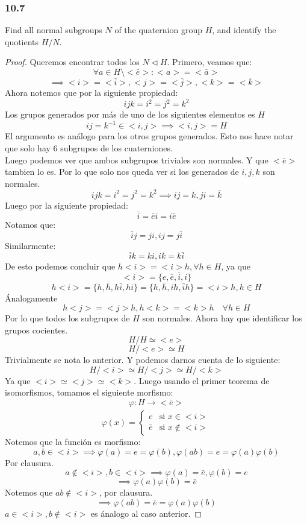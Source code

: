 \documentclass[11pt]{article}
\newcommand{\func}[5]{#1:#2\xrightarrow[#5]{#4}#3}
\theoremstyle{definition}
\begin{document}
\subsubsection{10.7}
Find all normal subgroups $N$ of the quaternion group $H$, and identify the quotients $H/N$.
\begin{proof}
    Queremos encontrar todos los $N\triangleleft H$. Primero, veamos que: 
    \[\forall a\in H\setminus<\bar{e}>:<a>=<\bar{a}>\]
    \[\implies <i>=<\bar{i}>,<j>=<\bar{j}>,<k>=<\bar{k}>\]
    Ahora notemos que por la siguiente propiedad:
    \[ijk=i^2=j^2=k^2\]
    Los grupos generados por más de uno de los siguientes elementos es $H$
    \[ij=k^{-1}\in <i,j>\implies <i,j>=H\]
    El argumento es análogo para los otros grupos generados. Esto nos hace notar que solo hay 6 subgrupos de los cuaterniones.\\
    Luego podemos ver que ambos subgrupos triviales son normales. Y que $<\bar{e}>$ tambien lo es. Por lo que solo nos queda ver si los generados de $i,j,k$ son normales.
    \[ijk=i^2=j^2=k^2\implies ij=k, ji=\bar{k}\]
    Luego por la siguiente propiedad:
    \[\bar{i}=\bar{e}i=i\bar{e}\]
    Notamos que:
    \[\bar{i}j=ji, ij=j\bar{i}\]
    Similarmente:
    \[\bar{i}k=ki, ik=k\bar{i}\]
    De esto podemos concluir que $h<i>=<i>h, \forall h\in H$, ya que 
    \[<i>=\{e,\bar{e},\bar{i},i\}\]
    \[h<i>=\{h,\bar{h},h\bar{i},hi\}=\{h,\bar{h},ih,\bar{i}h\}=<i>h, h\in H\]
    Ánalogamente
    \[h<j>=<j>h, h<k>=<k>h\quad\forall h\in H\]
    Por lo que todos los subgrupos de $H$ son normales. Ahora hay que identificar los grupos cocientes.
    \[H/H\simeq <e>\]
    \[H/<e>\simeq H\]
    Trivialmente se nota lo anterior. Y podemos darnos cuenta de lo siguiente:
    \[H/<i>\simeq H/<j>\simeq H/<k>\]
    Ya que $<i>\simeq <j>\simeq <k>$. Luego usando el primer teorema de isomorfismos, tomamos el siguiente morfismo:
    \[\func{\varphi}{H}{<\bar{e}>}{}{}\]
    \[\varphi(x)=\begin{cases}
        e & \textrm{si }x\in<i>\\
        \bar{e} & \textrm{si } x\notin<i>
    \end{cases}\]
    Notemos que la función es morfismo:
    \[a,b\in<i>\implies \varphi(a)=e=\varphi(b), \varphi(ab)=e=\varphi(a)\varphi(b)\]
    Por clausura.
    \[a\notin<i>,b\in<i>\implies\varphi(a)=\bar{e},\varphi(b)=e\]
    \[\implies \varphi(a)\varphi(b)=\bar{e}\]
    Notemos que $ab\notin<i>$, por clausura.
    \[\implies\varphi(ab)=\bar{e}=\varphi(a)\varphi(b)\]
    $a\in<i>,b\notin<i>$ es ánalogo al caso anterior.

\end{proof}
\end{document}
